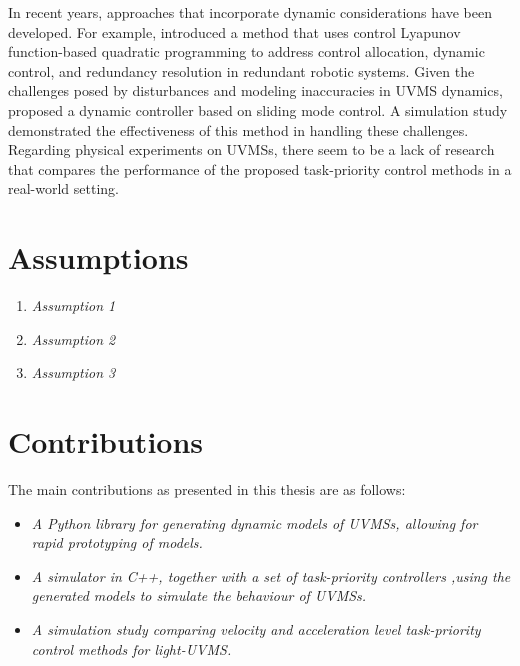 In recent years, approaches that incorporate dynamic considerations have been developed. For example, \cite{basso2020} introduced a method that uses control Lyapunov function-based quadratic programming to address control allocation, dynamic control, and redundancy resolution in redundant robotic systems. Given the challenges posed by disturbances and modeling inaccuracies in UVMS dynamics, \cite{iversflaten2022} proposed a dynamic controller based on sliding mode control. A simulation study demonstrated the effectiveness of this method in handling these challenges.
Regarding physical experiments on UVMSs, there seem to be a lack of research that
compares the performance of the proposed task-priority control methods in a real-world setting.




\section{Assumptions}
\begin{enumerate}
    \item \emph{Assumption 1}
    \item \emph{Assumption 2}
    \item \emph{Assumption 3}
\end{enumerate}

\section{Contributions}

The main contributions as presented in this thesis are as follows:
\begin{itemize}
    \item \emph{A Python library for generating dynamic models of UVMSs, allowing
        for rapid prototyping of models.}
    \item \emph{A simulator in C++, together with a set of task-priority controllers
        ,using the generated models to simulate the behaviour of UVMSs.}
    \item \emph{A simulation study comparing velocity and acceleration level
        task-priority control methods for light-UVMS.}
\end{itemize}

